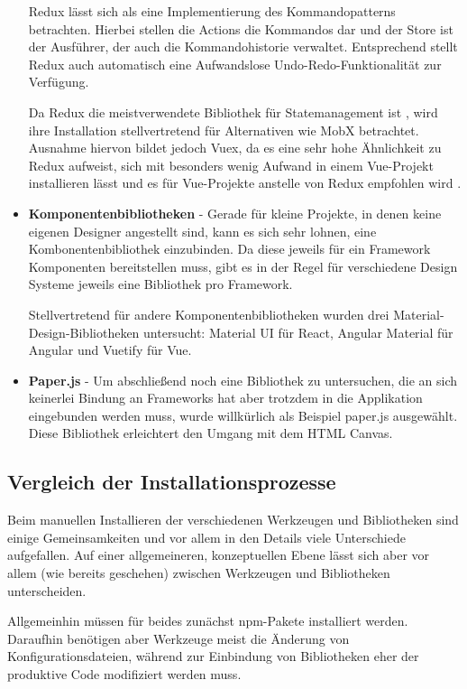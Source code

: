 \begin{itemize}
Redux lässt sich als eine Implementierung des Kommandopatterns betrachten. Hierbei stellen die Actions die Kommandos dar und der Store ist der Ausführer, der auch die Kommandohistorie verwaltet. Entsprechend stellt Redux auch automatisch eine Aufwandslose Undo-Redo-Funktionalität zur Verfügung.

Da Redux die meistverwendete Bibliothek für Statemanagement ist \cite{stateofjs}, wird ihre Installation stellvertretend für Alternativen wie MobX betrachtet. Ausnahme hiervon bildet jedoch Vuex, da es eine sehr hohe Ähnlichkeit zu Redux aufweist, sich mit besonders wenig Aufwand in einem Vue-Projekt installieren lässt und es für Vue-Projekte anstelle von Redux empfohlen wird \cite{vuejs_docs:redux_vs_vuex}.

\item \textbf{Komponentenbibliotheken} - Gerade für kleine Projekte, in denen keine eigenen Designer angestellt sind, kann es sich sehr lohnen, eine Kombonentenbibliothek einzubinden. Da diese jeweils für ein Framework Komponenten bereitstellen muss, gibt es in der Regel für verschiedene Design Systeme jeweils eine Bibliothek pro Framework.

Stellvertretend für andere Komponentenbibliotheken wurden drei Material-Design-Bibliotheken untersucht: Material UI für React, Angular Material für Angular und Vuetify für Vue.

\item \textbf{Paper.js} - Um abschließend noch eine Bibliothek zu untersuchen, die an sich keinerlei Bindung an Frameworks hat aber trotzdem in die Applikation eingebunden werden muss, wurde willkürlich als Beispiel paper.js ausgewählt. Diese Bibliothek erleichtert den Umgang mit dem HTML Canvas.
\end{itemize}

\subsection{Vergleich der Installationsprozesse}
Beim manuellen Installieren der verschiedenen Werkzeugen und Bibliotheken sind einige Gemeinsamkeiten und vor allem in den Details viele Unterschiede aufgefallen. Auf einer allgemeineren, konzeptuellen Ebene lässt sich aber vor allem (wie bereits geschehen) zwischen Werkzeugen und Bibliotheken unterscheiden.

Allgemeinhin müssen für beides zunächst \gls{npm}-Pakete installiert werden. Daraufhin benötigen aber Werkzeuge meist die Änderung von Konfigurationsdateien, während zur Einbindung von Bibliotheken eher der produktive Code modifiziert werden muss.

